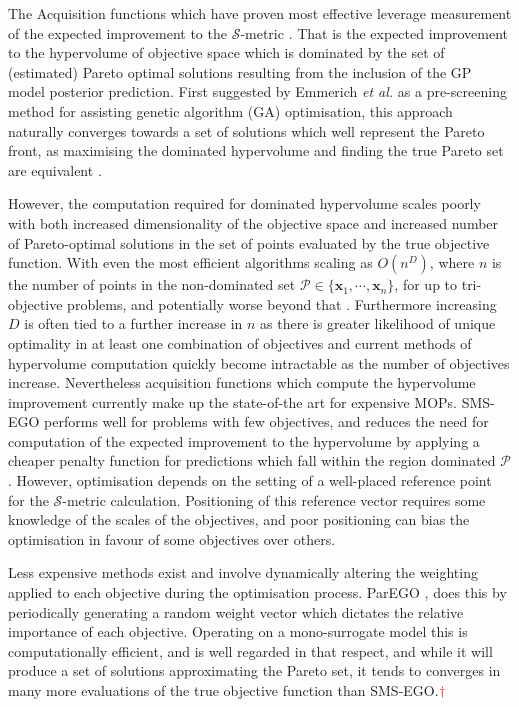 \documentclass[conference]{IEEEtran}
\makeatletter
\newcommand\hpv{dominated hypervolume\xspace}
\newcommand\smsego{SMS-EGO\xspace}
\newcommand\gp{GP\xspace}
\newcommand{\bx}{\mathbf{x}}
\newcommand{\mnote}[2][\textcolor{red}{\dagger}]{$#1$\marginpar{\color{red}\raggedright\tiny$#1$
    #2}}
\newcommand*{\etal}{\textit{et al.}\@\xspace}
\makeatother
\begin{document}
The Acquisition functions which have proven most effective leverage measurement of the expected improvement to the $\mathcal{S}$-metric  \cite{emmerich2008computation}. That is the expected improvement to the hypervolume of objective space which is dominated by the set of (estimated) Pareto optimal solutions resulting from the inclusion of the \gp model posterior prediction. First suggested by Emmerich \etal  \cite{emmerich2006single} as a pre-screening method for assisting genetic algorithm (GA) optimisation, this approach naturally converges towards a set of solutions which well represent the Pareto front, as maximising the \hpv and finding the true Pareto set are equivalent \cite{fleischer2003measure}. 

However, the computation required for \hpv scales poorly with both increased dimensionality of the objective space and increased number of Pareto-optimal solutions in the set of points evaluated by the true objective function. With even the most efficient algorithms scaling as $O(n^D)$, where $n$ is the number of points in the non-dominated set $\mathcal{P}\in\{\bx_1, \cdots, \bx_n\}$, for up to tri-objective problems, and potentially worse beyond that \cite{hupkens2014faster}. Furthermore increasing $D$ is often tied to a further increase in $n$ as there is greater likelihood of unique optimality in at least one combination of objectives and current methods of hypervolume computation quickly become intractable as the number of objectives increase. Nevertheless acquisition functions which compute the hypervolume improvement currently make up the state-of-the art for expensive MOPs. \smsego \cite{ponweiser2008multiobjective, wagner2010expected} performs well for problems with few objectives, and reduces the need for computation of the expected improvement to the hypervolume by applying a cheaper penalty function for predictions which fall within the region dominated $\mathcal{P}$. However, optimisation depends on the setting of a well-placed reference point for the $\mathcal{S}$-metric calculation. Positioning of this reference vector requires some knowledge of the scales of the objectives, and poor positioning can bias the optimisation in favour of some objectives over others. 

Less expensive methods exist and involve dynamically altering the weighting applied to each objective during the optimisation process. ParEGO \cite{knowles2006parego}, does this by periodically generating a random weight vector which dictates the relative importance of each objective. Operating on a mono-surrogate model this is computationally efficient, and is well regarded in that respect, and while it will produce a set of solutions approximating the Pareto set, it tends to converges in many more evaluations of the true objective function than \smsego.\mnote{think you nee a citation for this claim}
\end{document}
